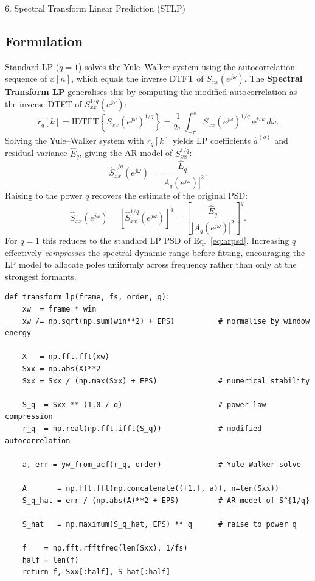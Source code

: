 \documentclass[12pt,a4paper,onecolumn]{exam}
\newcommand{\questionheader}[1]{%
  \begin{tcolorbox}[
    enhanced,
    colback=black,
    coltext=white,
    boxrule=0pt,
    fontupper=\Large\bfseries,
    arc=4mm
  ]
  #1
  \end{tcolorbox}%
}
\begin{document}
\questionheader{6. Spectral Transform Linear Prediction (STLP)}

\subsection*{Formulation}

Standard LP ($q=1$) solves the Yule--Walker system using the autocorrelation
sequence of $x[n]$, which equals the inverse DTFT of $S_{xx}(e^{j\omega})$.
The \textbf{Spectral Transform LP} generalises this by computing the
modified autocorrelation as the inverse DTFT of $S_{xx}^{1/q}(e^{j\omega})$:
\begin{equation}
  \tilde{r}_q[k] = \text{IDTFT}\!\left\{S_{xx}(e^{j\omega})^{1/q}\right\}
                  = \frac{1}{2\pi}\int_{-\pi}^{\pi}
                    S_{xx}(e^{j\omega})^{1/q}\,e^{j\omega k}\,d\omega.
  \label{eq:stlp_acf}
\end{equation}
Solving the Yule--Walker system with $\tilde{r}_q[k]$ yields LP coefficients
$\hat{a}^{(q)}$ and residual variance $\hat{E}_q$, giving the AR model of
$S_{xx}^{1/q}$:
\begin{equation}
  \hat{S}^{1/q}_{xx}(e^{j\omega}) = \frac{\hat{E}_q}{\left|A_q(e^{j\omega})\right|^2}.
  \label{eq:stlp_model}
\end{equation}
Raising to the power $q$ recovers the estimate of the original PSD:
\begin{equation}
  \hat{S}_{xx}(e^{j\omega}) = \left[\hat{S}^{1/q}_{xx}(e^{j\omega})\right]^q
                            = \left[\frac{\hat{E}_q}{\left|A_q(e^{j\omega})\right|^2}\right]^q.
  \label{eq:stlp_psd}
\end{equation}
For $q=1$ this reduces to the standard LP PSD of Eq.~\eqref{eq:arpsd}.
Increasing $q$ effectively \emph{compresses} the spectral dynamic range
before fitting, encouraging the LP model to allocate poles uniformly
across frequency rather than only at the strongest formants.

\begin{lstlisting}[caption={STLP implementation (\texttt{transform\_lp})}]
def transform_lp(frame, fs, order, q):
    xw  = frame * win
    xw /= np.sqrt(np.sum(win**2) + EPS)          # normalise by window energy

    X   = np.fft.fft(xw)
    Sxx = np.abs(X)**2
    Sxx = Sxx / (np.max(Sxx) + EPS)              # numerical stability

    S_q  = Sxx ** (1.0 / q)                      # power-law compression
    r_q  = np.real(np.fft.ifft(S_q))             # modified autocorrelation

    a, err = yw_from_acf(r_q, order)             # Yule-Walker solve

    A       = np.fft.fft(np.concatenate(([1.], a)), n=len(Sxx))
    S_q_hat = err / (np.abs(A)**2 + EPS)         # AR model of S^{1/q}

    S_hat   = np.maximum(S_q_hat, EPS) ** q      # raise to power q

    f    = np.fft.rfftfreq(len(Sxx), 1/fs)
    half = len(f)
    return f, Sxx[:half], S_hat[:half]
\end{lstlisting}
\end{document}
